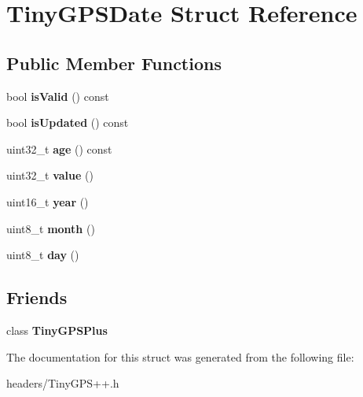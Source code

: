\hypertarget{struct_tiny_g_p_s_date}{}\section{Tiny\+G\+P\+S\+Date Struct Reference}
\label{struct_tiny_g_p_s_date}
\subsection*{Public Member Functions}
\begin{DoxyCompactItemize}
\item 
bool {\bfseries is\+Valid} () const \hypertarget{struct_tiny_g_p_s_date_a0ef145848ab03e4e9db0e2cf3a4c42cd}{}\label{struct_tiny_g_p_s_date_a0ef145848ab03e4e9db0e2cf3a4c42cd}

\item 
bool {\bfseries is\+Updated} () const \hypertarget{struct_tiny_g_p_s_date_aed8706c1c3e67558fec2b94476c144e0}{}\label{struct_tiny_g_p_s_date_aed8706c1c3e67558fec2b94476c144e0}

\item 
uint32\+\_\+t {\bfseries age} () const \hypertarget{struct_tiny_g_p_s_date_a7b92ac9058dbde1770eb52ce5da890c1}{}\label{struct_tiny_g_p_s_date_a7b92ac9058dbde1770eb52ce5da890c1}

\item 
uint32\+\_\+t {\bfseries value} ()\hypertarget{struct_tiny_g_p_s_date_a718150ae16f68afa9ae81f9d1b3ce3f4}{}\label{struct_tiny_g_p_s_date_a718150ae16f68afa9ae81f9d1b3ce3f4}

\item 
uint16\+\_\+t {\bfseries year} ()\hypertarget{struct_tiny_g_p_s_date_ae2cc914fec377b429d99f01204f50d60}{}\label{struct_tiny_g_p_s_date_ae2cc914fec377b429d99f01204f50d60}

\item 
uint8\+\_\+t {\bfseries month} ()\hypertarget{struct_tiny_g_p_s_date_a6f3c5b4e72ef28b010f94ac9016315f3}{}\label{struct_tiny_g_p_s_date_a6f3c5b4e72ef28b010f94ac9016315f3}

\item 
uint8\+\_\+t {\bfseries day} ()\hypertarget{struct_tiny_g_p_s_date_ae8cc5f80c49e328f792d168a44062000}{}\label{struct_tiny_g_p_s_date_ae8cc5f80c49e328f792d168a44062000}

\end{DoxyCompactItemize}
\subsection*{Friends}
\begin{DoxyCompactItemize}
\item 
class {\bfseries Tiny\+G\+P\+S\+Plus}\hypertarget{struct_tiny_g_p_s_date_a6501fd5ef19ae166d43e0e5781609ee2}{}\label{struct_tiny_g_p_s_date_a6501fd5ef19ae166d43e0e5781609ee2}

\end{DoxyCompactItemize}


The documentation for this struct was generated from the following file\+:\begin{DoxyCompactItemize}
\item 
headers/Tiny\+G\+P\+S++.\+h\end{DoxyCompactItemize}
